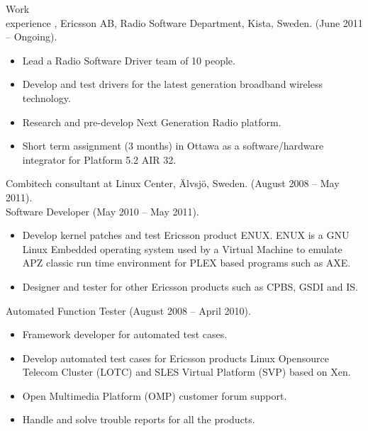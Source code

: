 \documentclass{../../cls/cv}
\author{Samuel Gabrielsson - Curriculum Vitae}
\begin{document}
\maketitle

\begin{category}{Work \\experience}
, Ericsson AB, Radio Software Department, Kista, Sweden. (June 2011 -- Ongoing).
\begin{itemize}
   \item Lead a Radio Software Driver team of 10 people.
   \item Develop and test drivers for the latest generation broadband wireless technology.
   \item Research and pre-develop Next Generation Radio platform.
   \item Short term assignment (3 months) in Ottawa as a software/hardware integrator for Platform 5.2 AIR 32.
\end{itemize}

 Combitech consultant at Linux Center, \"Alvsj\"o, Sweden. (August 2008 -- May 2011).\\
Software Developer (May 2010 -- May 2011).
\begin{itemize}
   \item Develop kernel patches and test Ericsson product ENUX. ENUX is a GNU Linux Embedded operating system used by a Virtual Machine to emulate APZ classic run time environment for PLEX based programs such as AXE.
   \item Designer and tester for other Ericsson products such as CPBS, GSDI and IS.
\end{itemize}
Automated Function Tester (August 2008 -- April 2010).
\begin{itemize}
   \item Framework developer for automated test cases.
   \item Develop automated test cases for Ericsson products Linux Opensource Telecom Cluster (LOTC) and SLES Virtual Platform (SVP) based on Xen.
   \item Open Multimedia Platform (OMP) customer forum support.
   \item Handle and solve trouble reports for all the products.
\end{itemize}



\end{category}
\end{document}
